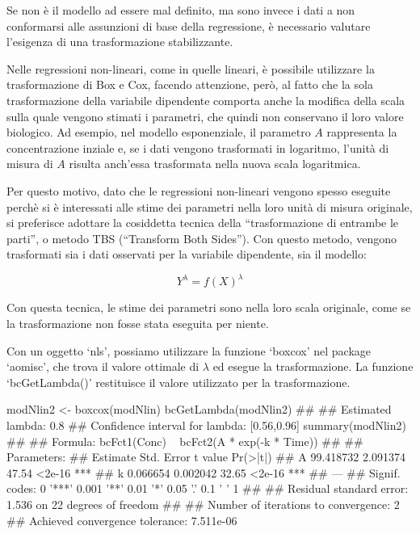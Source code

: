 \documentclass[a4paper,12pt,oneside]{book}
\newenvironment{Shaded}{}{}
\newcommand{\KeywordTok}[1]{#1}
\newcommand{\StringTok}[1]{#1}
\newcommand{\CommentTok}[1]{#1}
\newcommand{\NormalTok}[1]{#1}
\begin{document}
Se non è il modello ad essere mal definito, ma sono invece i dati a non conformarsi alle assunzioni di base della regressione, è necessario valutare l'esigenza di una trasformazione stabilizzante.

Nelle regressioni non-lineari, come in quelle lineari, è possibile utilizzare la trasformazione di Box e Cox, facendo attenzione, però, al fatto che la sola trasformazione della variabile dipendente comporta anche la modifica della scala sulla quale vengono stimati i parametri, che quindi non conservano il loro valore biologico. Ad esempio, nel modello esponenziale, il parametro \(A\) rappresenta la concentrazione inziale e, se i dati vengono trasformati in logaritmo, l'unità di misura di \(A\) risulta anch'essa trasformata nella nuova scala logaritmica.

Per questo motivo, dato che le regressioni non-lineari vengono spesso eseguite perchè si è interessati alle stime dei parametri nella loro unità di misura originale, si preferisce adottare la cosiddetta tecnica della ``trasformazione di entrambe le parti'', o metodo TBS (``Transform Both Sides''). Con questo metodo, vengono trasformati sia i dati osservati per la variabile dipendente, sia il modello:

\[Y^\lambda  = f(X)^\lambda\]

Con questa tecnica, le stime dei parametri sono nella loro scala originale, come se la trasformazione non fosse stata eseguita per niente.

Con un oggetto `nls', possiamo utilizzare la funzione `boxcox' nel package `aomisc', che trova il valore ottimale di \(\lambda\) ed esegue la trasformazione. La funzione `bcGetLambda()' restituisce il valore utilizzato per la trasformazione.

\begin{Shaded}
\begin{Highlighting}[]
\NormalTok{modNlin2 <-}\StringTok{ }\KeywordTok{boxcox}\NormalTok{(modNlin)}
\KeywordTok{bcGetLambda}\NormalTok{(modNlin2)}
\CommentTok{## }
\CommentTok{## Estimated lambda: 0.8 }
\CommentTok{## Confidence interval for lambda: [0.56,0.96]}
\KeywordTok{summary}\NormalTok{(modNlin2)}
\CommentTok{## }
\CommentTok{## Formula: bcFct1(Conc) ~ bcFct2(A * exp(-k * Time))}
\CommentTok{## }
\CommentTok{## Parameters:}
\CommentTok{##    Estimate Std. Error t value Pr(>|t|)    }
\CommentTok{## A 99.418732   2.091374   47.54   <2e-16 ***}
\CommentTok{## k  0.066654   0.002042   32.65   <2e-16 ***}
\CommentTok{## ---}
\CommentTok{## Signif. codes:  0 '***' 0.001 '**' 0.01 '*' 0.05 '.' 0.1 ' ' 1}
\CommentTok{## }
\CommentTok{## Residual standard error: 1.536 on 22 degrees of freedom}
\CommentTok{## }
\CommentTok{## Number of iterations to convergence: 2 }
\CommentTok{## Achieved convergence tolerance: 7.511e-06}
\end{Highlighting}
\end{Shaded}
\end{document}
